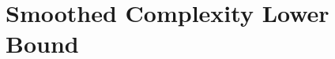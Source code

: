 \documentclass{theoretics}
\newcommand{\R}{\mathbb R}
\newcommand{\aff}{\operatorname{affhull}}
\newcommand{\conv}{\operatorname{conv}}
\newcommand{\dist}{\operatorname{dist}}
\begin{document}








\section{Smoothed Complexity Lower Bound}\label{sec:lb}
\end{document}
